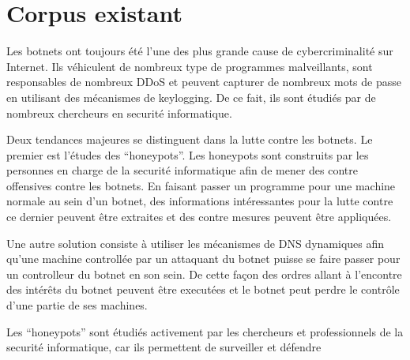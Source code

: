 \section{Corpus existant}

Les botnets ont toujours été l'une des plus grande cause de cybercriminalité sur
Internet. Ils véhiculent de nombreux type de programmes malveillants, sont responsables
de nombreux DDoS et peuvent capturer de nombreux mots de passe en utilisant des mécanismes
de keylogging. De ce fait, ils sont étudiés par de nombreux chercheurs en securité informatique.

Deux tendances majeures se distinguent dans la lutte contre les botnets.
Le premier est l'études des ``honeypots''. Les honeypots sont construits par les
personnes en charge de la securité informatique afin de mener des contre offensives
contre les botnets. En faisant passer un programme pour une machine normale au sein
d'un botnet, des informations intéressantes pour la lutte contre ce dernier peuvent
être extraites et des contre mesures peuvent être appliquées.

Une autre solution consiste à utiliser les mécanismes de DNS dynamiques
afin qu'une machine controllée par un attaquant du botnet puisse se faire
passer pour un controlleur du botnet en son sein. De cette façon des ordres
allant à l'encontre des intérêts du botnet peuvent être executées et le botnet
peut perdre le contrôle d'une partie de ses machines.


Les ``honeypots'' sont étudiés activement par les chercheurs et professionnels de
la securité informatique, car ils permettent de surveiller et défendre 

